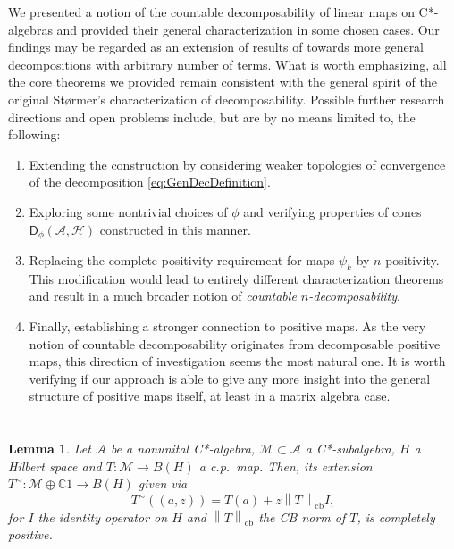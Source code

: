 \documentclass[reqno]{amsart}
\theoremstyle{plain}
\newtheorem{lemma}{Lemma}
\numberwithin{equation}{section}
\numberwithin{theorem}{section}
\numberwithin{lemma}{section}
\numberwithin{definition}{section}
\numberwithin{corollary}{section}
\numberwithin{remark}{section}
\newcommand{\complexes}{\mathbb{C}}
\newcommand{\cbnorm}[1]{\left\| #1 \right\|_{\mathrm{cb}}}
\newcommand{\hilbert}{\mathcal{H}}
\newcommand{\gdec}[3]{\mathsf{D}_{#1}(#2,#3)}
\begin{document}
We presented a notion of the countable decomposability of linear maps on C*-algebras and provided their general characterization in some chosen cases. Our findings may be regarded as an extension of results of \cite{Stormer_1982} towards more general decompositions with arbitrary number of terms. What is worth emphasizing, all the core theorems we provided remain consistent with the general spirit of the original Størmer's characterization of decomposability. Possible further research directions and open problems include, but are by no means limited to, the following:
\begin{enumerate}
    \item Extending the construction by considering weaker topologies of convergence of the decomposition \eqref{eq:GenDecDefinition}.
    \item Exploring some nontrivial choices of $\phi$ and verifying properties of cones $\gdec{\phi}{\mathscr{A}}{\hilbert}$ constructed in this manner.
    \item Replacing the complete positivity requirement for maps $\psi_k$ by $n$-positivity. This modification would lead to entirely different characterization theorems and result in a much broader notion of \emph{countable $n$-decomposability}.
    \item Finally, establishing a stronger connection to positive maps. As the very notion of countable decomposability originates from decomposable positive maps, this direction of investigation seems the most natural one. It is worth verifying if our approach is able to give any more insight into the general structure of positive maps itself, at least in a matrix algebra case.
\end{enumerate}

\appendix

\section{}

\begin{lemma}\label{lemma:Phi0ucp}
    Let $\mathscr{A}$ be a nonunital C*-algebra, $\mathscr{M} \subset \mathscr{A}$ a C*-subalgebra, $H$ a Hilbert space and $T : \mathscr{M}\to B(H)$ a c.p.~map. Then, its extension $T^\sim : \mathscr{M} \oplus \complexes 1 \to B(H)$ given via
    \begin{equation}
        T^\sim ((a,z)) = T(a) + z \cbnorm{T} I,
    \end{equation}
    for $I$ the identity operator on $H$ and $\cbnorm{T}$ the CB norm of $T$, is completely positive.
\end{lemma}
\end{document}
